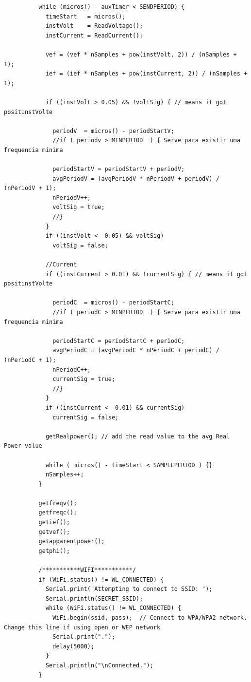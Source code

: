 \documentclass[12pt]{article}
\begin{document}
\begin{lstlisting}
          while (micros() - auxTimer < SENDPERIOD) {
            timeStart   = micros();
            instVolt    = ReadVoltage();
            instCurrent = ReadCurrent();
        
            vef = (vef * nSamples + pow(instVolt, 2)) / (nSamples + 1);
            ief = (ief * nSamples + pow(instCurrent, 2)) / (nSamples + 1);
        
            if ((instVolt > 0.05) && !voltSig) { // means it got positinstVolte
        
              periodV  = micros() - periodStartV;
              //if ( periodv > MINPERIOD  ) { Serve para existir uma frequencia minima
        
              periodStartV = periodStartV + periodV;
              avgPeriodV = (avgPeriodV * nPeriodV + periodV) / (nPeriodV + 1);
              nPeriodV++;
              voltSig = true;
              //}
            }
            if ((instVolt < -0.05) && voltSig)
              voltSig = false;
        
            //Current
            if ((instCurrent > 0.01) && !currentSig) { // means it got positinstVolte
        
              periodC  = micros() - periodStartC;
              //if ( periodC > MINPERIOD  ) { Serve para existir uma frequencia minima
        
              periodStartC = periodStartC + periodC;
              avgPeriodC = (avgPeriodC * nPeriodC + periodC) / (nPeriodC + 1);
              nPeriodC++;
              currentSig = true;
              //}
            }
            if ((instCurrent < -0.01) && currentSig)
              currentSig = false;
        
            getRealpower(); // add the read value to the avg Real Power value
        
            while ( micros() - timeStart < SAMPLEPERIOD ) {}
            nSamples++;
          }
          
          getfreqv();
          getfreqc();
          getief();
          getvef();
          getapparentpower();
          getphi();
        
          /***********WIFI***********/
          if (WiFi.status() != WL_CONNECTED) {
            Serial.print("Attempting to connect to SSID: ");
            Serial.println(SECRET_SSID);
            while (WiFi.status() != WL_CONNECTED) {
              WiFi.begin(ssid, pass);  // Connect to WPA/WPA2 network. Change this line if using open or WEP network
              Serial.print(".");
              delay(5000);
            }
            Serial.println("\nConnected.");
          }
        

\end{lstlisting}
\end{document}
